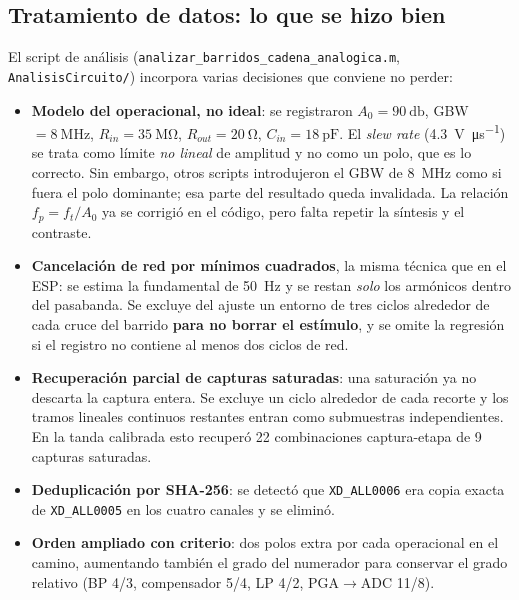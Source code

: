 
\subsection{Tratamiento de datos: lo que se hizo bien}

El script de an\'alisis (\texttt{analizar\_barridos\_cadena\_analogica.m},
\texttt{AnalisisCircuito/}) incorpora varias decisiones que conviene no perder:

\begin{itemize}[itemsep=0.2em]
\item \textbf{Modelo del operacional, no ideal}: se registraron
$A_0=\SI{90}{\decibel}$, GBW $=\SI{8}{\mega\hertz}$,
$R_{in}=\SI{35}{\mega\ohm}$,
$R_{out}=\SI{20}{\ohm}$, $C_{in}=\SI{18}{\pico\farad}$. El \emph{slew rate}
(\SI{4.3}{\volt\per\micro\second}) se trata como l\'imite \emph{no lineal} de
amplitud y no como un polo, que es lo correcto. Sin embargo, otros scripts
introdujeron el GBW de \SI{8}{\mega\hertz} como si fuera el polo dominante; esa
parte del resultado queda invalidada. La relaci\'on $f_p=f_t/A_0$ ya se corrigi\'o
en el c\'odigo, pero falta repetir la s\'intesis y el contraste.
\item \textbf{Cancelaci\'on de red por m\'inimos cuadrados}, la misma t\'ecnica
que en el ESP: se estima la fundamental de \SI{50}{\hertz} y se restan
\emph{solo} los arm\'onicos dentro del pasabanda. Se excluye del ajuste un
entorno de tres ciclos alrededor de cada cruce del barrido \textbf{para no
borrar el est\'imulo}, y se omite la regresi\'on si el registro no contiene al
menos dos ciclos de red.
\item \textbf{Recuperaci\'on parcial de capturas saturadas}: una saturaci\'on ya
no descarta la captura entera. Se excluye un ciclo alrededor de cada recorte y
los tramos lineales continuos restantes entran como submuestras
independientes. En la tanda calibrada esto recuper\'o 22 combinaciones
captura-etapa de 9 capturas saturadas.
\item \textbf{Deduplicaci\'on por SHA-256}: se detect\'o que \texttt{XD\_ALL0006}
era copia exacta de \texttt{XD\_ALL0005} en los cuatro canales y se elimin\'o.
\item \textbf{Orden ampliado con criterio}: dos polos extra por cada
operacional en el camino, aumentando tambi\'en el grado del numerador para
conservar el grado relativo (BP 4/3, compensador 5/4, LP 4/2, PGA$\to$ADC
11/8).
\end{itemize}

